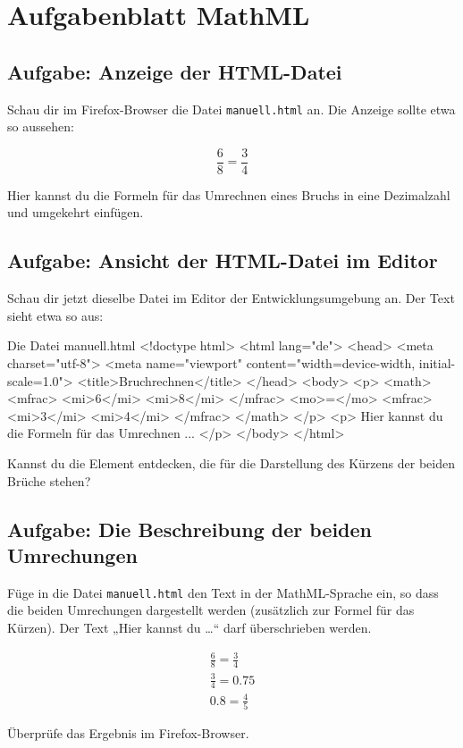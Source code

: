 \section{Aufgabenblatt MathML}

\subsection{Aufgabe: Anzeige der HTML-Datei}

Schau dir im Firefox-Browser die Datei \texttt{manuell.html} an. Die Anzeige sollte etwa so aussehen:

\begin{equation*}
\frac{6}{8} = \frac{3}{4}
\end{equation*}

Hier kannst du die Formeln für das Umrechnen eines Bruchs in eine Dezimalzahl und umgekehrt einfügen.

\subsection{Aufgabe: Ansicht der HTML-Datei im Editor}

Schau dir jetzt dieselbe Datei im Editor der Entwicklungsumgebung an. Der Text sieht etwa so aus:

\begin{codeHTML}{Die Datei manuell.html}
<!doctype html>
<html lang="de">
	<head>
		<meta charset="utf-8">
		<meta name="viewport" content="width=device-width, initial-scale=1.0">
		<title>Bruchrechnen</title>
	</head>
	<body>
		<p>
			<math>
				<mfrac>
					<mi>6</mi>
					<mi>8</mi>
				</mfrac>
				<mo>=</mo>
				<mfrac>
					<mi>3</mi>
					<mi>4</mi>
				</mfrac>
			</math>
		</p>
		<p>
 			Hier kannst du die Formeln für das Umrechnen ...
		</p>
	</body>
</html>
\end{codeHTML}

Kannst du die Element entdecken, die für die Darstellung des Kürzens der beiden Brüche stehen?

\subsection{Aufgabe: Die Beschreibung der beiden Umrechungen}

Füge in die Datei \texttt{manuell.html} den Text in der MathML-Sprache ein, so dass die beiden Umrechungen dargestellt werden (zusätzlich zur Formel für das Kürzen). Der Text „Hier kannst du \dots“ darf überschrieben werden.

\begin{align*}
& \frac{6}{8} = \frac{3}{4} & \\[2ex]
& \frac{3}{4} = 0.75 & \\[2ex]
& 0.8 = \frac{4}{5} & 
\end{align*}

Überprüfe das Ergebnis im Firefox-Browser.